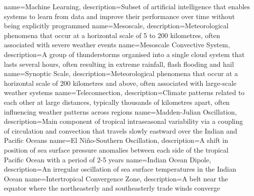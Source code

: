 {
    name=Machine Learning,
    description={Subset of artificial intelligence that enables systems to learn from data and improve their performance over time without being explicitly programmed}
}
{
    name=Mesoscale,
    description={Meteorological phenomena that occur at a horizontal scale of 5 to 200 kilometres, often associated with severe weather events}
}
{
    name=Mesoscale Convective System,
    description={A group of thunderstorms organised into a single cloud system that lasts several hours, often resulting in extreme rainfall, flash flooding and hail}
}
{
    name=Synoptic Scale,
    description={Meteorological phenomena that occur at a horizontal scale of 200 kilometres and above, often associated with large-scale weather systems}
}
{
    name=Teleconnection,
    description={Climate patterns related to each other at large distances, typically thousands of kilometres apart, often influencing weather patterns across regions}
}
{
    name=Madden-Julian Oscillation,
    description={Main component of tropical intraseasonal variability via a coupling of circulation and convection that travels slowly eastward over the Indian and Pacific Oceans}
}
{
    name=El Niño-Southern Oscillation,
    description={A shift in position of sea surface pressure anomalies between each side of the tropical Pacific Ocean with a period of 2-5 years}
}
{
    name=Indian Ocean Dipole,
    description={An irregular oscillation of sea surface temperatures in the Indian Ocean}
}
{
    name=Intertropical Convergence Zone,
    description={A belt near the equator where the northeasterly and southeasterly trade winds converge}
}

